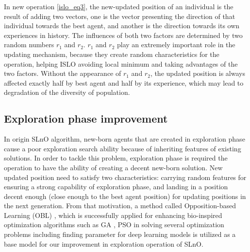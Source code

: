 \documentclass[a4paper,13pt,2p]{report}
\begin{document}
	In new operation \ref{islo_eq3}, the new-updated position of an individual is the result of adding two vectors, one is the vector presenting the direction of that individual towards the best agent, and another is the direction towards its own experiences in history. The influences of both two factors are determined by two random numbers $r_1$ and $r_2$. $r_1$ and $r_2$ play an extremely important role in the updating mechanism,  because  they create random characteristics for the operation, helping ISLO avoiding local minimum and taking advantages of the two factors. Without the appearance of $r_1$ and $r_2$, the updated position is always affected exactly half by best agent and half by its experience, which may lead to degradation of the diversity of population. 

\subsection{Exploration phase improvement}
\label{imprv_explore}
	
	In origin SLnO algorithm, new-born agents that are created in exploration phase cause a poor exploration search ability because of inheriting features of existing solutions. In order to tackle this problem, exploration phase is required the operation to have the ability of creating a decent new-born solution. New updated position need to satisfy two characteristics: carrying random features for ensuring a strong capability of exploration phase, and landing in a position decent enough (close enough to the best agent position) for updating positions in the next generation. From that motivation, a method called Opposition-based Learning (OBL) \cite{tizhoosh2005opposition}, which is successfully applied for enhancing bio-inspired optimization algorithms such as GA \cite{tizhoosh2005opposition}, PSO \cite{wang2007opposition} \cite{tang2009enhanced} in solving several optimization problems including finding parameter for deep learning models \cite{rashid2010improved} \cite{nguyen2019efficient} is utilized as a base model for our improvement in exploration operation of SLnO. 
	
\end{document}
